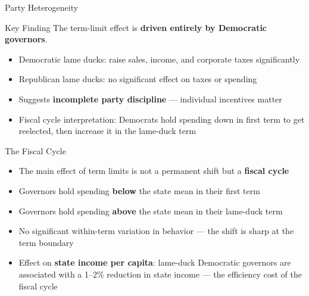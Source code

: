 \documentclass{beamer}
\begin{document}
\begin{frame}{Party Heterogeneity}
\begin{block}{Key Finding}
The term-limit effect is \textbf{driven entirely by Democratic governors}.
\end{block}
\vspace{0.5em}
\begin{itemize}
    \item Democratic lame ducks: raise sales, income, and corporate taxes significantly
    \item Republican lame ducks: no significant effect on taxes or spending
    \item Suggests \textbf{incomplete party discipline} --- individual incentives matter
    \vspace{0.5em}
    \item Fiscal cycle interpretation: Democrats hold spending down in first term to get reelected, then increase it in the lame-duck term
\end{itemize}
\end{frame}

\begin{frame}{The Fiscal Cycle}
\begin{itemize}
    \item The main effect of term limits is not a permanent shift but a \textbf{fiscal cycle}
    \vspace{0.5em}
    \item Governors hold spending \textbf{below} the state mean in their first term
    \item Governors hold spending \textbf{above} the state mean in their lame-duck term
    \vspace{0.5em}
    \item No significant within-term variation in behavior --- the shift is sharp at the term boundary
    \vspace{0.5em}
    \item Effect on \textbf{state income per capita}: lame-duck Democratic governors are associated with a 1--2\% reduction in state income --- the efficiency cost of the fiscal cycle
\end{itemize}
\end{frame}
\end{document}
